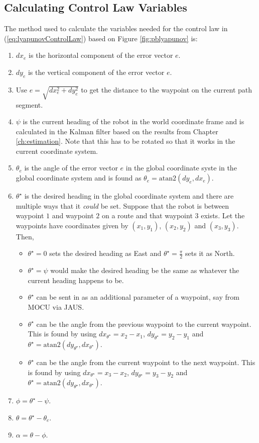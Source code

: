 \subsection{Calculating Control Law Variables}
\label{sec:lyapunovVariables}
The method used to calculate the variables needed for the control law in (\ref{eq:lyapunovControlLaw}) based on Figure \ref{fig:pblyapunov} is:
\begin{enumerate}
\item $dx_e$ is the horizontal component of the error vector $e$.
\item $dy_e$ is the vertical component of the error vector $e$.
\item Use $e = \sqrt{dx_e^2 + dy_e^2}$ to get the distance to the waypoint on the current path segment.
\item $\psi$ is the current heading of the robot in the world coordinate frame and is calculated in the Kalman filter based on the results from Chapter \ref{ch:estimation}. Note that this has to be rotated so that it works in the current coordinate system.
\item $\theta_e$ is the angle of the error vector $e$ in the global coordinate syste in the global coordinate system and is found as $\theta_e = \text{atan2}(dy_e,dx_e)$.
\item $\theta^\star$ is the desired heading in the global coordinate system and there are multiple ways that it \textit{could} be set. Suppose that the robot is between waypoint $1$ and waypoint $2$ on a route and that waypoint $3$ exists. Let the waypoints have coordinates given by $(x_1,y_1)$, $(x_2,y_2)$ and $(x_3,y_3)$. Then,
\begin{itemize}
\item $\theta^\star=0$ sets the desired heading as East and $\theta^\star=\frac{\pi}{2}$ sets it as North.
\item $\theta^\star=\psi$ would make the desired heading be the same as whatever the current heading happens to be.
\item $\theta^\star$ can be sent in as an additional parameter of a waypoint, say from MOCU via JAUS.
\item $\theta^\star$ can be the angle from the previous waypoint to the current waypoint. This is found by using $dx_{\theta^\star}=x_2-x_1$, $dy_{\theta^\star}=y_2-y_1$ and $\theta^\star=\text{atan2}(dy_{\theta^\star},dx_{\theta^\star})$.
\item $\theta^\star$ can be the angle from the current waypoint to the next waypoint. This is found by using $dx_{\theta^\star}=x_3-x_2$, $dy_{\theta^\star}=y_3-y_2$ and $\theta^\star=\text{atan2}(dy_{\theta^\star},dx_{\theta^\star})$.
\end{itemize}
\item $\phi=\theta^\star-\psi$.
\item $\theta=\theta^\star - \theta_e$.
\item $\alpha = \theta - \phi$.
\end{enumerate}

